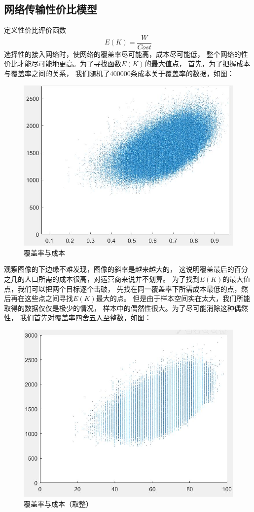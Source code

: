 \documentclass[UTF8,12pt]{ctexart}
\begin{document}
    \subsection{网络传输性价比模型}\label{WLCSXJB}
        定义性价比评价函数$$E(K)=\frac{W}{Cost}$$
        选择性的接入网络时，使网络的覆盖率尽可能高，成本尽可能低，
        整个网络的性价比才能尽可能地更高。为了寻找函数$E(K)$的最大值点，
        首先，为了把握成本与覆盖率之间的关系，
        我们随机了400000条成本关于覆盖率的数据，如图：
        \begin{figure}[H]
            \centering
            \includegraphics[scale=0.45]{400000.jpg}
            \caption{覆盖率与成本}
            \end{figure} 
        观察图像的下边缘不难发现，图像的斜率是越来越大的，
        这说明覆盖最后的百分之几的人口所需的成本很高，对运营商来说并不划算。
        为了找到$E(K)$的最大值点，我们可以把两个目标逐个击破，
        先找在同一覆盖率下所需成本最低的点，然后再在这些点之间寻找$E(K)$最大的点。
        但是由于样本空间实在太大，我们所能取得的数据仅仅是极少的情况，
        样本中的偶然性很大。为了尽可能消除这种偶然性，
        我们首先对覆盖率四舍五入至整数，如图：
        \begin{figure}[H]
            \centering
            \includegraphics[scale=0.45]{400000z.jpg}
            \caption{覆盖率与成本（取整）}
            \end{figure}
\end{document}

